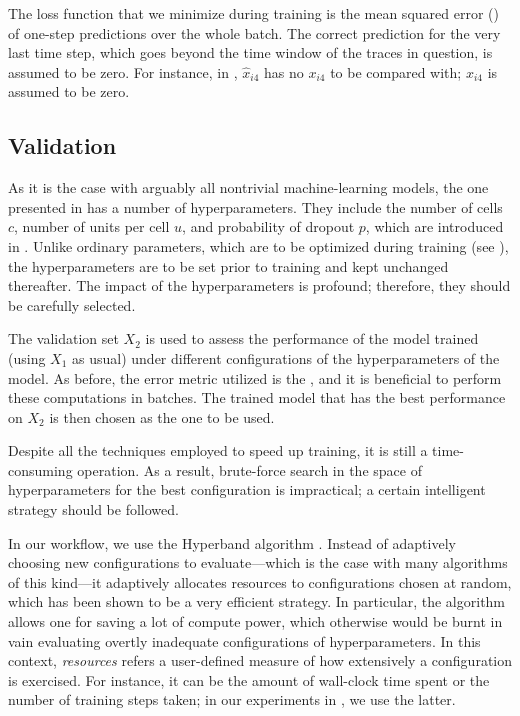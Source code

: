 The loss function that we minimize during training is the mean squared error
() \cite{hastie2009} of one-step predictions over the whole batch. The
correct prediction for the very last time step, which goes beyond the time
window of the traces in question, is assumed to be zero. For instance, in
, $\hat{x}_{i4}$ has no $x_{i4}$ to be compared with; $x_{i4}$ is
assumed to be zero.

\subsection{Validation} 
As it is the case with arguably all nontrivial machine-learning models, the one
presented in  has a number of hyperparameters. They include the
number of cells $c$, number of units per cell $u$, and probability of dropout
$p$, which are introduced in . Unlike ordinary parameters, which
are to be optimized during training (see ), the hyperparameters
are to be set prior to training and kept unchanged thereafter. The impact of the
hyperparameters is profound; therefore, they should be carefully selected.

The validation set $X_2$ is used to assess the performance of the model trained
(using $X_1$ as usual) under different configurations of the hyperparameters of
the model. As before, the error metric utilized is the , and it is
beneficial to perform these computations in batches. The trained model that has
the best performance on $X_2$ is then chosen as the one to be used.

Despite all the techniques employed to speed up training, it is still a
time-consuming operation. As a result, brute-force search in the space of
hyperparameters for the best configuration is impractical; a certain intelligent
strategy should be followed.

In our workflow, we use the Hyperband algorithm \cite{li2016}. Instead of
adaptively choosing new configurations to evaluate---which is the case with many
algorithms of this kind---it adaptively allocates resources to configurations
chosen at random, which has been shown to be a very efficient strategy. In
particular, the algorithm allows one for saving a lot of compute power, which
otherwise would be burnt in vain evaluating overtly inadequate configurations of
hyperparameters. In this context, \emph{resources} refers a user-defined measure
of how extensively a configuration is exercised. For instance, it can be the
amount of wall-clock time spent or the number of training steps taken; in our
experiments in , we use the latter.

